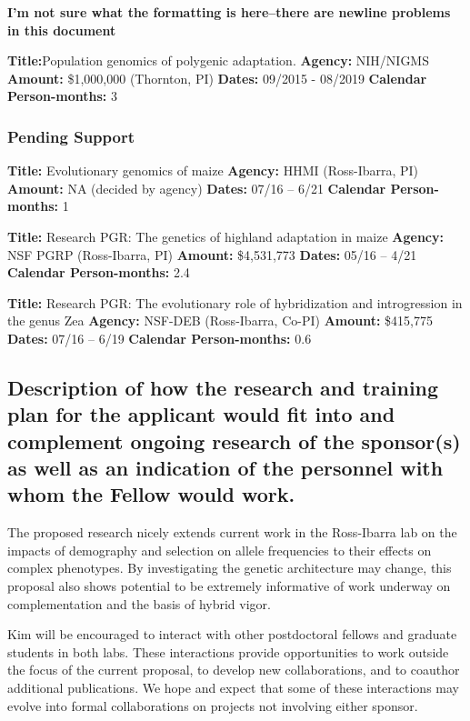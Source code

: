 \textbf{I'm not sure what the formatting is here--there are newline problems in this document}

\noindent\textbf{Title:}Population genomics of polygenic adaptation. 
\textbf{Agency:} NIH/NIGMS 
\textbf{Amount:} \$1,000,000 (Thornton, PI)
\textbf{Dates:} 09/2015 - 08/2019
\textbf{Calendar Person-months:} 3

\subsubsection*{Pending Support}

\noindent\textbf{Title:} Evolutionary genomics of maize 
\textbf{Agency:} HHMI (Ross-Ibarra, PI)
\textbf{Amount:} NA (decided by agency)
\textbf{Dates:} 07/16 – 6/21
\textbf{Calendar Person-months:} 1

\noindent\textbf{Title:} Research PGR: The genetics of highland adaptation in maize
\textbf{Agency:} NSF PGRP (Ross-Ibarra, PI)
\textbf{Amount:} \$4,531,773
\textbf{Dates:} 05/16 – 4/21
\textbf{Calendar Person-months:} 2.4

\noindent\textbf{Title:} Research PGR: The evolutionary role of hybridization and introgression in the genus Zea
\textbf{Agency:} NSF-DEB (Ross-Ibarra, Co-PI)
\textbf{Amount:} \$415,775
\textbf{Dates:} 07/16 – 6/19
\textbf{Calendar Person-months:} 0.6

\subsection{Description of how the research and training plan for the applicant would fit into and complement ongoing research of the sponsor(s) as well as an indication of the personnel with whom the Fellow would work.}

The proposed research nicely extends current work in the Ross-Ibarra lab on the impacts of demography and selection on allele frequencies to their effects on complex phenotypes. By investigating the genetic architecture may change, this proposal also shows potential to be extremely informative of work underway on complementation and the basis of hybrid vigor.  

Kim will be encouraged to interact with other postdoctoral fellows and graduate students in both labs.  These interactions provide opportunities to work outside the focus of the current proposal, to develop new collaborations, and to coauthor additional publications.  We hope and expect that some of these interactions may evolve into formal collaborations on projects not involving either sponsor.  

